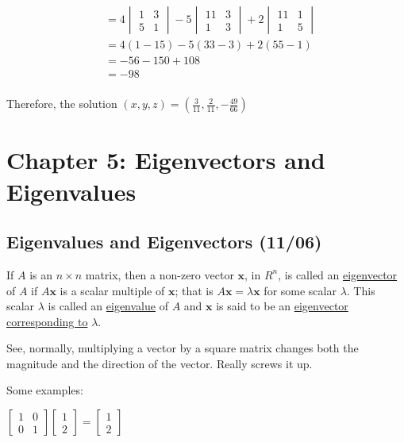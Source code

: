 \documentclass[
  letterpaper,
  DIV=11,
  numbers=noendperiod]{scrartcl}
\begin{document}
\begin{align*}
&= 4\begin{vmatrix}1 & 3 \\ 5 & 1\end{vmatrix}-5\begin{vmatrix}11 & 3 \\ 1 & 3\end{vmatrix}+2\begin{vmatrix}11 & 1 \\ 1 & 5\end{vmatrix} \\
&= 4(1-15)-5(33-3)+2(55-1) \\
&= -56-150+108 \\
&= -98 \\
\end{align*}

Therefore, the solution
\((x, y, z) = (\frac{3}{11}, \frac{2}{11}, -\frac{49}{66})\)

\newpage{}

\hypertarget{chapter-5-eigenvectors-and-eigenvalues}{%
\section{Chapter 5: Eigenvectors and
Eigenvalues}\label{chapter-5-eigenvectors-and-eigenvalues}}

\hypertarget{eigenvalues-and-eigenvectors-1106}{%
\subsection{Eigenvalues and Eigenvectors
(11/06)}\label{eigenvalues-and-eigenvectors-1106}}

If \(A\) is an \(n \times n\) matrix, then a non-zero vector
\(\symbf{x}\), in \(R^n\), is called an \ul{eigenvector} of \(A\) if
\(A\symbf{x}\) is a scalar multiple of \(\symbf{x}\); that is
\(A\symbf{x} = \lambda\symbf{x}\) for some scalar \(\lambda\). This
scalar \(\lambda\) is called an \ul{eigenvalue} of \(A\) and
\(\symbf{x}\) is said to be an \ul{eigenvector corresponding to}
\(\lambda\).

See, normally, multiplying a vector by a square matrix changes both the
magnitude and the direction of the vector. Really screws it up.

Some examples:

\(\begin{bmatrix}1 & 0 \\ 0 & 1\end{bmatrix}\begin{bmatrix}1 \\ 2\end{bmatrix}=\begin{bmatrix}1 \\ 2\end{bmatrix}\)
\end{document}
